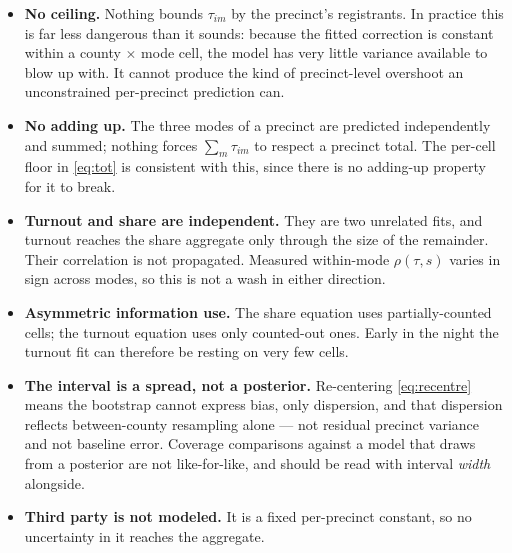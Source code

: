\documentclass[11pt]{article}
\begin{document}
\begin{itemize}
  \item \textbf{No ceiling.} Nothing bounds $\tau_{im}$ by the precinct's registrants.
        In practice this is far less dangerous than it sounds: because the fitted
        correction is constant within a county $\times$ mode cell, the model has very
        little variance available to blow up with. It cannot produce the kind of
        precinct-level overshoot an unconstrained per-precinct prediction can.
  \item \textbf{No adding up.} The three modes of a precinct are predicted independently
        and summed; nothing forces $\sum_m \tau_{im}$ to respect a precinct total. The
        per-cell floor in \eqref{eq:tot} is consistent with this, since there is no
        adding-up property for it to break.
  \item \textbf{Turnout and share are independent.} They are two unrelated fits, and
        turnout reaches the share aggregate only through the size of the remainder. Their
        correlation is not propagated. Measured within-mode $\rho(\tau, s)$ varies in sign
        across modes, so this is not a wash in either direction.
  \item \textbf{Asymmetric information use.} The share equation uses partially-counted
        cells; the turnout equation uses only counted-out ones. Early in the night the
        turnout fit can therefore be resting on very few cells.
  \item \textbf{The interval is a spread, not a posterior.} Re-centering
        \eqref{eq:recentre} means the bootstrap cannot express bias, only dispersion, and
        that dispersion reflects between-county resampling alone --- not residual
        precinct variance and not baseline error. Coverage comparisons against a model
        that draws from a posterior are not like-for-like, and should be read with
        interval \emph{width} alongside.
  \item \textbf{Third party is not modeled.} It is a fixed per-precinct constant, so no
        uncertainty in it reaches the aggregate.
\end{itemize}
\end{document}
